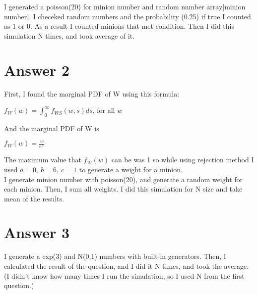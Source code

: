 \documentclass[12pt]{article}
\begin{document}
 I generated a poisson(20) for minion number and random number array[minion number]. I checeked random numbers and the probability (0.25) if true I counted as 1 or 0. As a result I counted minions that met condition. Then I did this simulation N times, and took average of it.


\section*{Answer 2}

First, I found the marginal PDF of W using this formula:
\begin{center}
    $f_W(w) = \int_{0}^{\infty} f_{WS}(w,s)ds$, for all $w$
\end{center}
And the marginal PDF of W is
\begin{center}
    $f_W(w)= \frac{w}{e^w}$
\end{center}
The maximum value that $f_W(w)$ can be was 1 so while using rejection method I used $a=0,\ b = 6,\ c = 1$ to generate a weight for a minion.\\

I generate minion number with poisson(20), and generate a random weight for each minion. Then, I sum all weights. I did this simulation for N size and take mean of the results.


\section*{Answer 3}

I generate a exp(3) and N(0,1) numbers with built-in generators. Then, I calculated the result of the question, and I did it N times, and took the average. (I didn't know how many times I run the simulation, so I used N from the first question.)
\end{document}
